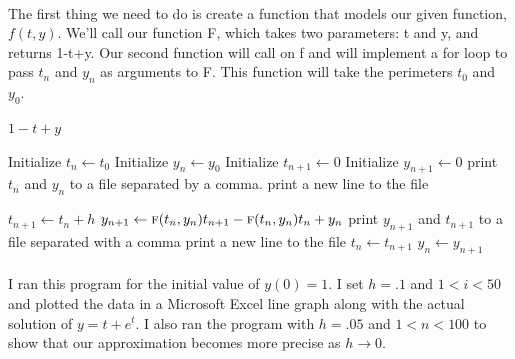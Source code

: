 \documentclass[font =22]{report}
\begin{document}
\paragraph{}
The first thing we need to do is create a function that models our given function, $f(t,y)$. 
We'll call our function F, which takes two parameters: t and y, and returns 1-t+y. Our second function will call on f and will implement a for loop to pass $t_n$ and $y_n$ as arguments to F.  This function will take the perimeters $t_0$ and $y_0$.   
 

 \begin{algorithmic}
\State \Return $1-t+y$
\EndFunction 
 
 
\State Initialize $t_n \gets t_0$ 
 \State Initialize $y_n \gets y_0$ 
 \State Initialize $t_{n+1} \gets 0 $
 \State Initialize $y_{n+1} \gets 0$
 \State print $t_n$ and $y_n$ to a file separated by a comma.
 \State print a new line to the file

 
\State $t_{n+1} \gets t_n + h$
\State $y_{n+1} \gets \Call{f}{t_n,y_n}t_{n+1} - \Call{f}{t_n,y_n} t_n +y_n$
\State print $y_{n+1}$ and $t_{n+1}$ to a file separated with a comma
\State print a new line to the file
\State $t_n \gets t_{n+1}$
\State $y_n \gets y_{n+1}$
\EndFor

\EndFunction
	
\end{algorithmic}
 
\paragraph{}
I ran this program for the initial value of $y(0)=1$. I set $h = . 1$ and $1<i<50$ and plotted the data in a Microsoft Excel line graph along with the actual solution of $y = t + e^t$. I also ran the program with $h = .05$ and $1<n<100$ to show that our approximation becomes more precise as $h \to 0$.
\end{document}
